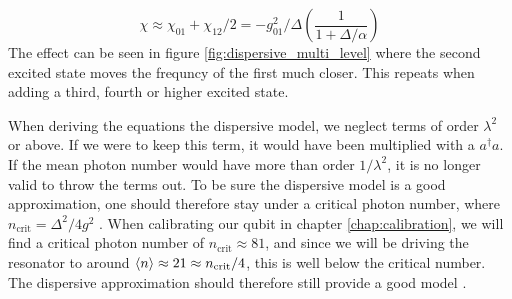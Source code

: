 \begin{equation}\label{eq:chi}
    \chi \approx \chi_{01} + \chi_{12}/2 = - g_{01}^2/\Delta \left(\frac{1}{1 + \Delta / \alpha}\right)
\end{equation}
The effect can be seen in figure \ref{fig:dispersive_multi_level} where the second excited state moves the frequncy of the first much closer. This repeats when adding a third, fourth or higher excited state.

When deriving the equations the dispersive model, we neglect terms of order $\lambda^2$ or above. If we were to keep this term, it would have been multiplied with a $a^\dagger a$. If the mean photon number would have more than order $1 / \lambda^2$, it is no longer valid to throw the terms out. To be sure the dispersive model is a good approximation, one should therefore stay under a critical photon number, where $n_{\text{crit}} = \Delta^2 / 4 g^2$ \cite{krantz_quantum_2019}.
When calibrating our qubit in chapter \ref{chap:calibration}, we will find a critical photon number of $n_{\text{crit}} \approx 81$, and since we will be driving the resonator to around $\expval{n} \approx 21 \approx n_{\text{crit}} / 4$, this is well below the critical number. The dispersive approximation should therefore still provide a good model \cite{boissonneault_dispersive_2009}. 



